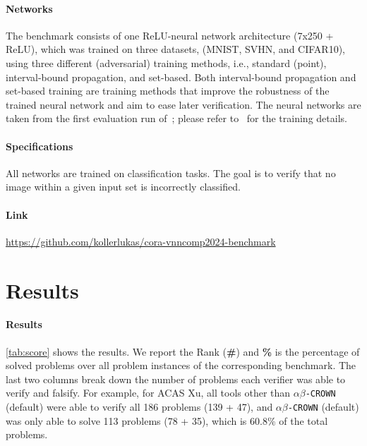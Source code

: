 \documentclass[oneside,11pt,dvipsnames]{book}
\newcommand{\crowndefault}{\texttt{$\alpha\beta$-CROWN} (default)}
\begin{document}
\paragraph*{Networks} The benchmark consists of one ReLU-neural network architecture (7x250 + ReLU), which was trained on three datasets, (MNIST, SVHN, and CIFAR10), using three different (adversarial) training methods, i.e., standard (point), interval-bound propagation, and set-based. Both interval-bound propagation and set-based training are training methods that improve the robustness of the trained neural network and aim to ease later verification. The neural networks are taken from the first evaluation run of~\cite{koller_et_al_2024}; please refer to~\cite{koller_et_al_2024} for the training details.
\paragraph*{Specifications} All networks are trained on classification tasks. The goal is to verify that no image within a given input set is incorrectly classified.
\paragraph*{Link} \url{https://github.com/kollerlukas/cora-vnncomp2024-benchmark}

\section{Results}


\paragraph{Results} \autoref{tab:score} shows the results. We report the Rank (\textbf{\#}) and  \textbf{\%} is the percentage of solved problems over all problem instances of the corresponding benchmark.   The last two columns break down the number of problems each verifier was able to verify and falsify. For example, for ACAS Xu, all tools other than \crowndefault{} were able to verify all 186 problems (139 + 47), and \crowndefault{} was only able to solve 113 problems (78 + 35), which is 60.8\% of the total problems. 

\newcommand{\nsTwentyFour}{\texttt{NeuralSAT}$_\text{VNN-COMP'24}$}
\newcommand{\ns}{\texttt{NeuralSAT}}
\end{document}
